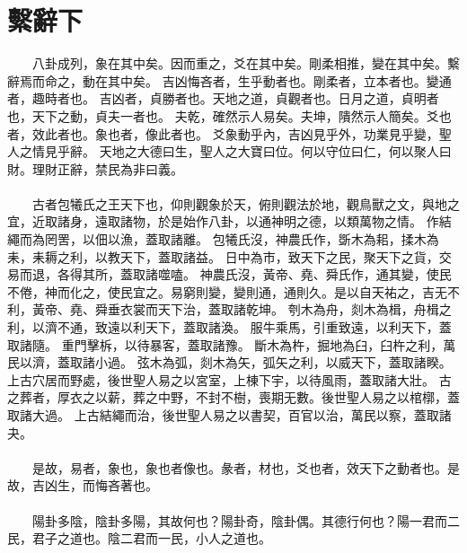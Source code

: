 \section{繫辭下}
　　八卦成列，象在其中矣。因而重之，爻在其中矣。剛柔相推，變在其中矣。繫辭焉而命之，動在其中矣。 吉凶悔吝者，生乎動者也。剛柔者，立本者也。變通者，趣時者也。 吉凶者，貞勝者也。天地之道，貞觀者也。日月之道，貞明者也，天下之動，貞夫一者也。 夫乾，確然示人易矣。夫坤，隤然示人簡矣。爻也者，效此者也。象也者，像此者也。 爻象動乎內，吉凶見乎外，功業見乎變，聖人之情見乎辭。 天地之大德曰生，聖人之大寶曰位。何以守位曰仁，何以聚人曰財。理財正辭，禁民為非曰義。 
\\\\
　　古者包犧氏之王天下也，仰則觀象於天，俯則觀法於地，觀鳥獸之文，與地之宜，近取諸身，遠取諸物，於是始作八卦，以通神明之德，以類萬物之情。 作結繩而為罔罟，以佃以漁，蓋取諸離。 包犧氏沒，神農氏作，斲木為耜，揉木為耒，耒耨之利，以教天下，蓋取諸益。 日中為市，致天下之民，聚天下之貨，交易而退，各得其所，蓋取諸噬嗑。 神農氏沒，黃帝、堯、舜氏作，通其變，使民不倦，神而化之，使民宜之。易窮則變，變則通，通則久。是以自天祐之，吉无不利，黃帝、堯、舜垂衣裳而天下治，蓋取諸乾坤。 刳木為舟，剡木為楫，舟楫之利，以濟不通，致遠以利天下，蓋取諸渙。 服牛乘馬，引重致遠，以利天下，蓋取諸隨。 重門擊柝，以待暴客，蓋取諸豫。 斷木為杵，掘地為臼，臼杵之利，萬民以濟，蓋取諸小過。 弦木為弧，剡木為矢，弧矢之利，以威天下，蓋取諸睽。 上古穴居而野處，後世聖人易之以宮室，上棟下宇，以待風雨，蓋取諸大壯。 古之葬者，厚衣之以薪，葬之中野，不封不樹，喪期无數。後世聖人易之以棺槨，蓋取諸大過。 上古結繩而治，後世聖人易之以書契，百官以治，萬民以察，蓋取諸夬。 
\\\\
　　是故，易者，象也，象也者像也。彖者，材也，爻也者，效天下之動者也。是故，吉凶生，而悔吝著也。 
\\\\
　　陽卦多陰，陰卦多陽，其故何也？陽卦奇，陰卦偶。其德行何也？陽一君而二民，君子之道也。陰二君而一民，小人之道也。 
\\\\
